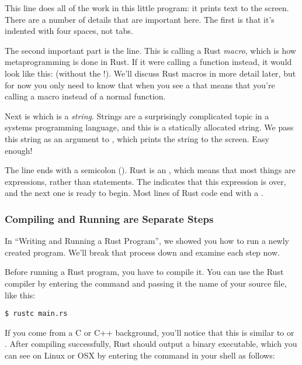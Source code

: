 This line does all of the work in this little program: it prints text to the screen. There are a number of details that are important 
here. The first is that it's indented with four spaces, not tabs.

\blank

The second important part is the  line. This is calling a Rust \emph{macro}, which is how metaprogramming is done 
in Rust. If it were calling a function instead, it would look like this:  (without the !). We'll discuss Rust macros 
in more detail later, but for now you only need to know that when you see a \code{!} that means that you're calling a macro 
instead of a normal function.

\blank

Next is  which is a \emph{string}. Strings are a surprisingly complicated topic in a systems programming 
language, and this is a statically allocated string. We pass this string as an argument to , which prints the 
string to the screen. Easy enough!

\blank

The line ends with a semicolon (\code{;}). Rust is an , which means that most things are 
expressions, rather than statements. The \code{;} indicates that this expression is over, and the next one is ready 
to begin. Most lines of Rust code end with a \code{;}.

\subsubsection*{Compiling and Running are Separate Steps}

In \enquote{Writing and Running a Rust Program}, we showed you how to run a newly created program. We'll break that process 
down and examine each step now.

\blank

Before running a Rust program, you have to compile it. You can use the Rust compiler by entering the 
 command and passing it the name of your source file, like this:

\begin{verbatim}
$ rustc main.rs
\end{verbatim}

If you come from a C or C++ background, you'll notice that this is similar to  or . After 
compiling successfully, Rust should output a binary executable, which you can see on Linux or OSX by entering the 
 command in your shell as follows:

